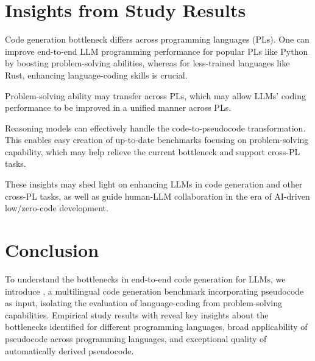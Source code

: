 \section{Insights from Study Results}


\indent\indent {} Code generation bottleneck differs across programming languages (PLs). %
One can improve end-to-end LLM programming performance for popular PLs like Python by boosting problem-solving abilities, whereas for less-trained languages like Rust, enhancing language-coding skills is crucial.

Problem-solving ability may transfer across PLs, which may allow LLMs' coding performance to be improved in a unified manner across PLs.

Reasoning models can effectively handle the code-to-pseudocode transformation. This enables easy creation of up-to-date benchmarks focusing on problem-solving capability, which may help relieve the current bottleneck and support cross-PL tasks.


These insights may shed light on enhancing LLMs in code generation and other cross-PL tasks, as well as guide human-LLM collaboration in the era of AI-driven low/zero-code development.


\section{Conclusion}\label{sec:conclusion}

To understand the bottlenecks in end-to-end code generation for LLMs, we introduce \name, a multilingual code generation benchmark incorporating pseudocode as input,
isolating the evaluation of language-coding from problem-solving capabilities. Empirical study results with \name reveal key insights about the bottlenecks identified for different programming languages, broad applicability of pseudocode across programming languages, and exceptional quality of automatically derived pseudocode. %

\clearpage
